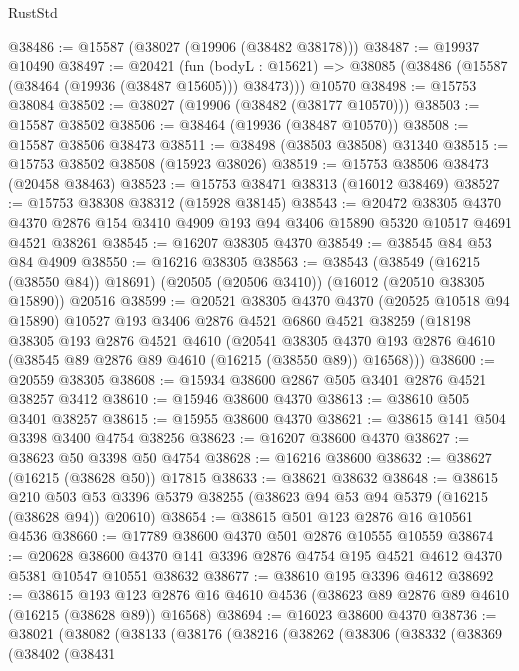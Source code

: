 \begin{lexlean}{RustStd}
\begin{coremodule}
@38486 := @15587 (@38027 (@19906 (@38482 @38178)))
@38487 := @19937 @10490
@38497 := @20421
    (fun (bodyL : @15621) => @38085 (@38486 (@15587 (@38464 (@19936 (@38487 @15605))) @38473)))
    @10570
@38498 := @15753 @38084
@38502 := @38027 (@19906 (@38482 (@38177 @10570)))
@38503 := @15587 @38502
@38506 := @38464 (@19936 (@38487 @10570))
@38508 := @15587 @38506 @38473
@38511 := @38498 (@38503 @38508) @31340
@38515 := @15753 @38502 @38508 (@15923 @38026)
@38519 := @15753 @38506 @38473 (@20458 @38463)
@38523 := @15753 @38471 @38313 (@16012 @38469)
@38527 := @15753 @38308 @38312 (@15928 @38145)
@38543 := @20472
    @38305
    @4370
    @4370
    @2876
    @154
    @3410
    @4909
    @193
    @94
    @3406
    @15890
    @5320
    @10517
    @4691
    @4521
    @38261
@38545 := @16207 @38305 @4370
@38549 := @38545 @84 @53 @84 @4909
@38550 := @16216 @38305
@38563 := @38543
    (@38549 (@16215 (@38550 @84)) @18691)
    (@20505 (@20506 @3410))
    (@16012 (@20510 @38305 @15890))
    @20516
@38599 := @20521
    @38305
    @4370
    @4370
    (@20525 @10518 @94 @15890)
    @10527
    @193
    @3406
    @2876
    @4521
    @6860
    @4521
    @38259
    (@18198
      @38305
      @193
      @2876
      @4521
      @4610
      (@20541
        @38305
        @4370
        @193
        @2876
        @4610
        (@38545 @89 @2876 @89 @4610 (@16215 (@38550 @89)) @16568)))
@38600 := @20559 @38305
@38608 := @15934 @38600 @2867 @505 @3401 @2876 @4521 @38257 @3412
@38610 := @15946 @38600 @4370
@38613 := @38610 @505 @3401 @38257
@38615 := @15955 @38600 @4370
@38621 := @38615 @141 @504 @3398 @3400 @4754 @38256
@38623 := @16207 @38600 @4370
@38627 := @38623 @50 @3398 @50 @4754
@38628 := @16216 @38600
@38632 := @38627 (@16215 (@38628 @50)) @17815
@38633 := @38621 @38632
@38648 := @38615
    @210
    @503
    @53
    @3396
    @5379
    @38255
    (@38623 @94 @53 @94 @5379 (@16215 (@38628 @94)) @20610)
@38654 := @38615 @501 @123 @2876 @16 @10561 @4536
@38660 := @17789 @38600 @4370 @501 @2876 @10555 @10559
@38674 := @20628
    @38600
    @4370
    @141
    @3396
    @2876
    @4754
    @195
    @4521
    @4612
    @4370
    @5381
    @10547
    @10551
    @38632
@38677 := @38610 @195 @3396 @4612
@38692 := @38615
    @193
    @123
    @2876
    @16
    @4610
    @4536
    (@38623 @89 @2876 @89 @4610 (@16215 (@38628 @89)) @16568)
@38694 := @16023 @38600 @4370
@38736 := @38021
    (@38082
      (@38133
        (@38176
          (@38216
            (@38262
              (@38306
                (@38332
                  (@38369
                    (@38402
                      (@38431

\end{coremodule}
\end{lexlean}
